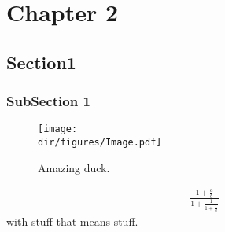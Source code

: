 \chapter{Chapter 2}
\label{ch:chapter-2}

\lipsum[1-2]

\section{Section1}
\label{ch:section1}

\lipsum[1-2]

\subsection{SubSection 1}
\label{ch:subSection1}

\lipsum[1-6]
\begin{figure}[t]
	\centering
	\texttt{[image: \\dir/figures/Image.pdf]}
	\caption{Amazing duck.}
	\label{fig:Duck2}
\end{figure}

\begin{align}
	\frac{1+\frac{a}{b}}{1+\frac{1}{1+\frac{1}{a}}}
	\label{eq:random_eq}
\end{align}
with stuff that means stuff.

